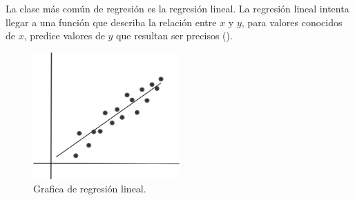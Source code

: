 La clase más común de regresión es la regresión lineal. La regresión lineal intenta llegar a una función que describa la relación entre $x$ y $y$, para valores conocidos de $x$, predice valores de $y$ que resultan ser precisos (\cite{patterson2017deep}).

\begin{figure}[H]
    \centering
    \includegraphics[width=0.5\textwidth]{
      MarcoTeorico/imgs/RegresionLineal.png
    }
    \caption{Grafica de regresión lineal.}
    \label{fig:regresionLineal}
\end{figure}
